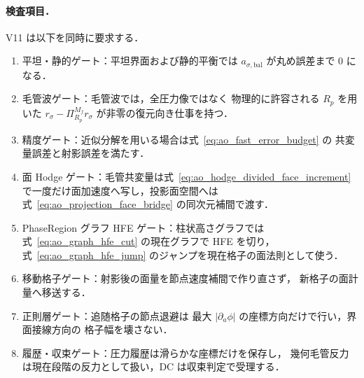 \paragraph{検査項目．}
V11 は以下を同時に要求する．
\begin{enumerate}[noitemsep]
  \item 平坦・静的ゲート：平坦界面および静的平衡では
        $a_{\sigma,\mathrm{bal}}$ が丸め誤差まで $0$ になる．
  \item 毛管波ゲート：毛管波では，全圧力像ではなく
        物理的に許容される $R_p$ を用いた
        $r_\sigma-\Pi^{M_f}_{R_p}r_\sigma$ が非零の復元向き仕事を持つ．
  \item 精度ゲート：近似分解を用いる場合は式~\eqref{eq:ao_fast_error_budget} の
        共変量誤差と射影誤差を満たす．
  \item 面 Hodge ゲート：毛管共変量は式~\eqref{eq:ao_hodge_divided_face_increment}
        で一度だけ面加速度へ写し，投影面空間へは
        式~\eqref{eq:ao_projection_face_bridge} の同次元補間で渡す．
  \item PhaseRegion グラフ HFE ゲート：柱状高さグラフでは
        式~\eqref{eq:ao_graph_hfe_cut} の現在グラフで HFE を切り，
        式~\eqref{eq:ao_graph_hfe_jump} のジャンプを現在格子の面法則として使う．
  \item 移動格子ゲート：射影後の面量を節点速度補間で作り直さず，
        新格子の面計量へ移送する．
  \item 正則層ゲート：追随格子の節点退避は
        最大 $|\partial_a\phi|$ の座標方向だけで行い，界面接線方向の
        格子幅を壊さない．
  \item 履歴・収束ゲート：圧力履歴は滑らかな座標だけを保存し，
        幾何毛管反力は現在段階の反力として扱い，DC は収束判定で受理する．
\end{enumerate}

